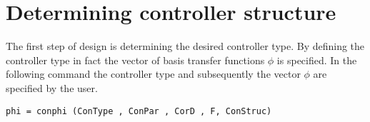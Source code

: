 \documentclass [12pt , a4paper] {report}
\begin{document}
\section{Determining controller structure}
The first step of design is determining the desired controller type. By defining the controller type in fact the vector of basis transfer functions $\phi$ is specified. In the following command the controller type and subsequently the vector $\phi$ are specified by the user.
\begin{lstlisting}
phi = conphi (ConType , ConPar , CorD , F, ConStruc) 
\end{lstlisting}
\end{document}
